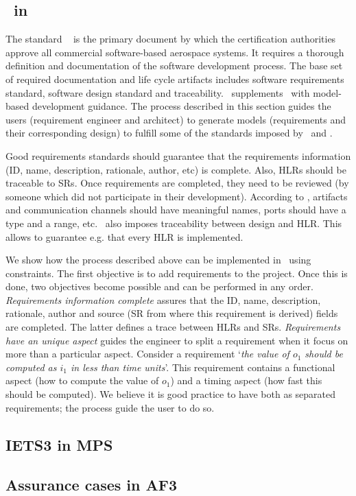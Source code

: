 
\subsection{\doone\ in \afthree}

The standard \doone~\cite{do178c} is the primary document by which the certification authorities approve all commercial software-based aerospace systems.
It requires a thorough definition and documentation of the software development process. 
The base set of required documentation and life cycle artifacts includes software requirements standard, software design standard and traceability.
\dothree\ supplements \doone\ with model-based development guidance.
The process described in this section guides the users (requirement engineer and architect) to generate models (requirements and their corresponding design) to fulfill some of the standards imposed by \doone\ and \dothree.

Good requirements standards should guarantee that the requirements information (ID, name, description, rationale, author, etc) is complete.
Also, HLRs should be traceable to SRs.
Once requirements are completed, they need to be reviewed (by someone which did not participate in their development).
According to \dothree, artifacts and communication channels should have meaningful names, ports should have a type and a range, etc.
\doone\ also imposes traceability between design and HLR.
This allows to guarantee e.g. that every HLR is implemented.

We show how the process described above can be implemented in \afthree\ using constraints.
The first objective is to add requirements to the project. 
Once this is done, two objectives become possible and can be performed in any order. 
\emph{Requirements information complete} assures that the ID, name, description, rationale, author and source (SR from where this requirement is derived) fields are completed. 
The latter defines a trace between HLRs and SRs.
\emph{Requirements have an unique aspect} guides the engineer to split a requirement when it focus on more than a particular aspect.
Consider a requirement `\emph{the value of $o_1$ should be computed as $i_1$ in less than time units}'.
This requirement contains a functional aspect (how to compute the value of $o_1$) and a timing aspect (how fast this should be computed).
We believe it is good practice to have both as separated requirements; the process guide the user to do so.

\subsection{IETS3 in MPS}

\subsection{Assurance cases in AF3}
